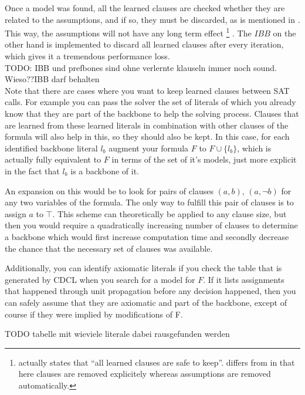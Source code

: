 Once a model was found, all the learned clauses are checked whether they are related to the assumptions, and if so, they must be discarded, as is mentioned in \cite{WKS01}. This way, the assumptions will not have any long term effect
\footnote{\cite{ENSO03} actually states that ``all learned clauses are safe to keep''. \cite{WKS01} differs from \cite{ENSO03} in that here clauses are removed explicitely whereas assumptions are removed automatically.}
. The $IBB$ on the other hand is implemented to discard all learned clauses after every iteration, which gives it a tremendous performance loss.\\

TODO: IBB und prefbones sind ohne verlernte klauseln immer noch sound. Wieso??IBB darf behalten\\

Note that there are cases where you want to keep learned clauses between SAT calls. For example you can pass the solver the set of literals of which you already know that they are part of the backbone to help the solving process. Clauses that are learned from these learned literals in combination with other clauses of the formula will also help in this, so they should also be kept. In this case, for each identified backbone literal $l_b$ augment your formula $F$ to $F \cup \{l_b\}$, which is actually fully equivalent to $F$ in terms of the set of it's models, just more explicit in the fact that $l_b$ is a backbone of it.

An expansion on this would be to look for pairs of clauses $(a,b)$, $(a,\neg b)$ for any two variables of the formula. The only way to fulfill this pair of clauses is to assign $a$ to $\top$. This scheme can theoretically be applied to any clause size, but then you would require a quadratically increasing number of clauses to determine a backbone which would first increase computation time and secondly decrease the chance that the necessary set of clauses was available.

Additionally, you can identify axiomatic literals if you check the table that is generated by CDCL when you search for a model for $F$. If it lists assignments that happened through unit propagation before any decision happened, then you can safely assume that they are axiomatic and part of the backbone, except of course if they were implied by modifications of F.

TODO tabelle mit wieviele literale dabei rausgefunden werden


